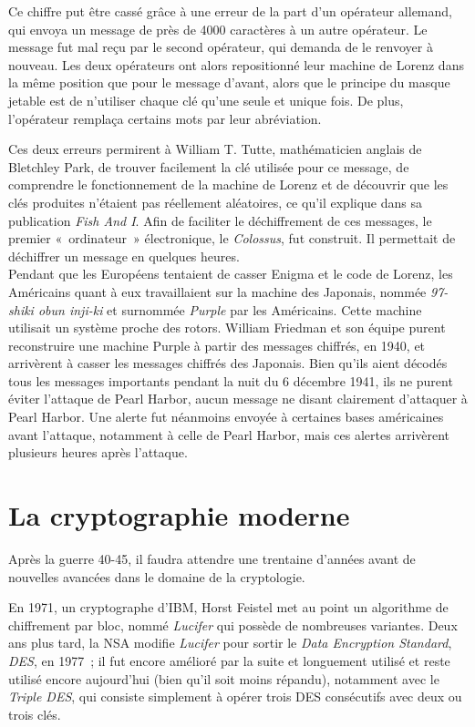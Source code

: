 Ce chiffre put être cassé grâce à une erreur de la part d'un opérateur
allemand, qui envoya un message de près de 4000 caractères à un autre
opérateur. Le message fut mal reçu par le second opérateur, qui
demanda de le renvoyer à nouveau. Les deux opérateurs ont alors
repositionné leur machine de Lorenz dans la même position que pour
le message d'avant, alors que le principe du masque jetable est de
n'utiliser chaque clé qu'une seule et unique fois. De plus,
l'opérateur remplaça certains mots par leur abréviation. 

Ces deux erreurs permirent à William T. Tutte, mathématicien anglais
de Bletchley Park, de trouver
facilement la clé utilisée pour ce message, de comprendre le
fonctionnement de la machine de Lorenz et de découvrir que les clés
produites n'étaient pas réellement aléatoires, ce qu'il explique dans
sa publication \emph{Fish And I}\cite{FISHAndI}.
Afin de faciliter le déchiffrement de ces messages, le
premier «~ordinateur~» électronique, le \emph{Colossus}, fut
construit. Il permettait de déchiffrer un message en quelques
heures. \\ 

Pendant que les Européens tentaient de casser Enigma et le code de
Lorenz, les Américains quant à eux travaillaient sur la machine des
Japonais, nommée \emph{97-shiki obun inji-ki} et surnommée \emph{Purple}
par les Américains. Cette machine utilisait un système proche des
rotors. William Friedman et son équipe purent reconstruire une machine
Purple à partir des messages chiffrés, en 1940, et arrivèrent à casser
les messages chiffrés des Japonais. Bien qu'ils aient décodés tous les
messages importants pendant la nuit du 6 décembre 1941, ils ne purent
éviter l'attaque de Pearl Harbor, aucun message ne disant
clairement d'attaquer à Pearl Harbor. Une alerte fut néanmoins
envoyée
à certaines bases américaines avant l'attaque, notamment à celle de
Pearl Harbor, mais ces alertes arrivèrent plusieurs heures après
l'attaque.

\section{La cryptographie moderne}
Après la guerre 40-45, il faudra attendre une trentaine d'années avant de
nouvelles avancées dans le domaine de la cryptologie. 

En 1971, un cryptographe d'IBM, Horst Feistel met au point un
algorithme de chiffrement par bloc, nommé \emph{Lucifer} qui
possède de nombreuses variantes. Deux ans plus tard, la NSA modifie
\emph{Lucifer} pour sortir le \emph{Data Encryption Standard},
\emph{DES}, en 1977~; il fut encore amélioré par la suite et longuement
utilisé et reste utilisé encore aujourd'hui (bien qu'il soit moins
répandu), notamment avec le \emph{Triple DES}, qui consiste
simplement à opérer trois DES consécutifs avec deux ou trois clés. %

